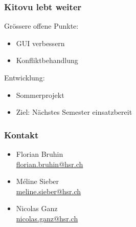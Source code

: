 \documentclass{beamer}
\begin{document}
	
	\begin{frame}
	\frametitle{Kitovu lebt weiter}
	
	Grössere offene Punkte:
	\begin{itemize}
	  \item GUI verbessern
	  \item Konfliktbehandlung
	\end{itemize}
	
	Entwicklung:
	\begin{itemize}
	  \item Sommerprojekt
	  \item Ziel: Nächstes Semester einsatzbereit
	\end{itemize}
	\end{frame}
	
	\begin{frame}
	\frametitle{Kontakt}
	\begin{itemize}
	  \item Florian Bruhin \\ \url{florian.bruhin@hsr.ch} \\[2em]
	  \item Méline Sieber \\ \url{meline.sieber@hsr.ch} \\[2em]
	  \item Nicolas Ganz \\ \url{nicolas.ganz@hsr.ch}
	\end{itemize}
	\end{frame}
\end{document}
